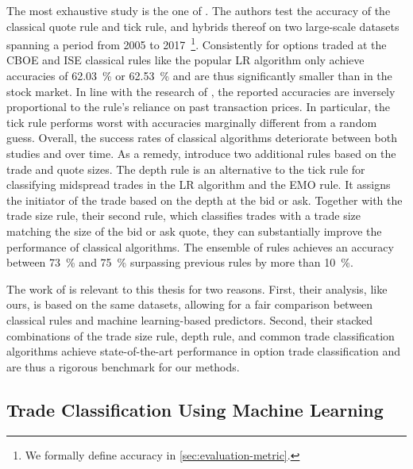 The most exhaustive study is the one of \textcite[1--39]{grauerOptionTradeClassification2022}. The authors test the accuracy of the classical quote rule and tick rule, and hybrids thereof on two large-scale datasets spanning a period from 2005 to 2017~\footnote{We formally define accuracy in \cref{sec:evaluation-metric}.}. Consistently for options traded at the \gls{CBOE} and \gls{ISE} classical rules like the popular \gls{LR}  algorithm only achieve accuracies of \SI{62.03}{\percent} or \SI{62.53}{\percent} and are thus significantly smaller than in the stock market. In line with the research of \textcite[886]{savickasInferringDirectionOption2003}, the reported accuracies are inversely proportional to the rule's reliance on past transaction prices. In particular, the tick rule performs worst with accuracies marginally different from a random guess. Overall, the success rates of classical algorithms deteriorate between both studies and over time. As a remedy, \textcite[14--17]{grauerOptionTradeClassification2022} introduce two additional rules based on the trade and quote sizes. The depth rule is an alternative to the tick rule for classifying midspread trades in the \gls{LR}  algorithm and the \gls{EMO} rule. It assigns the initiator of the trade based on the depth at the bid or ask. Together with the trade size rule, their second rule, which classifies trades with a trade size matching the size of the bid or ask quote, they can substantially improve the performance of classical algorithms. The ensemble of rules achieves an accuracy between \SI{73}{\percent} and \SI{75}{\percent} surpassing previous rules by more than \SI{10}{\percent}.

The work of \textcite[1--39]{grauerOptionTradeClassification2022} is relevant to this thesis for two reasons. First, their analysis, like ours, is based on the same datasets, allowing for a fair comparison between classical rules and machine learning-based predictors. Second, their stacked combinations of the trade size rule, depth rule, and common trade classification algorithms achieve state-of-the-art performance in option trade classification and are thus a rigorous benchmark for our methods.

\subsection{Trade Classification Using Machine Learning}
\label{sec:trade-classification-using-machine-learning}

